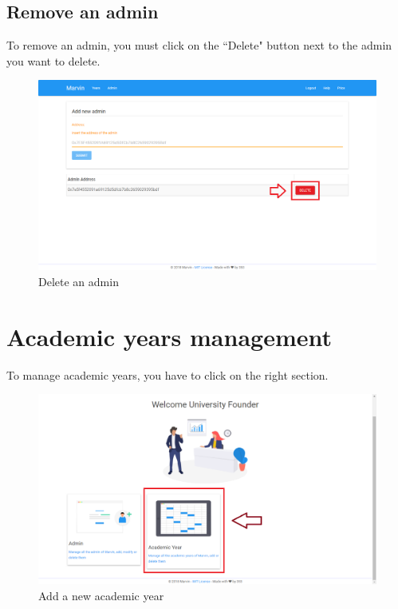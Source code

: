\documentclass[ManualeUtente]{subfiles}
\begin{document}
\subsection{Remove an admin}
To remove an admin, you must click on the ``Delete" button next to the admin you want to delete.
\begin{figure}[H]
	\centering
	\includegraphics[width=0.7\linewidth]{image/DeleteAdmin}
	\caption[Delete admin]{Delete an admin}
	\label{fig:Delete an admin}
\end{figure}
\newpage

\section{Academic years management}
To manage academic years, you have to click on the right section.
\begin{figure}[H]
	\centering
	\includegraphics[width=0.7\linewidth]{image/UniAcademicYear}
	\caption[Add year]{Add a new academic year}
	\label{fig:Add a new academic year}
\end{figure}
\end{document}
